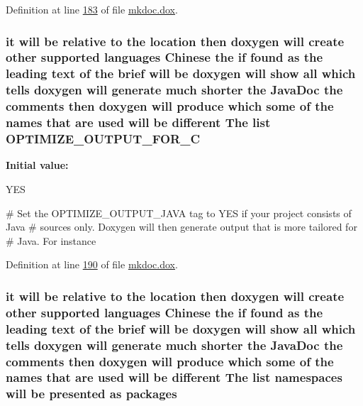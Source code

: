 Definition at line \hyperlink{mkdoc_8dox_source_l00183}{183} of file \hyperlink{mkdoc_8dox_source}{mkdoc.\-dox}.

\hypertarget{mkdoc_8dox_aa542a8f1572d888d9ecd0f903a299444}{
\subsubsection[{O\-P\-T\-I\-M\-I\-Z\-E\-\_\-\-O\-U\-T\-P\-U\-T\-\_\-\-F\-O\-R\-\_\-\-C}]{\setlength{\rightskip}{0pt plus 5cm}it will be relative to the location then doxygen will create other supported languages {\bf Chinese} the if found as the leading text of the brief will be doxygen will show all which tells doxygen will generate much shorter the Java\-Doc the comments then doxygen will produce which some of the names that {\bf are} used will be different The list O\-P\-T\-I\-M\-I\-Z\-E\-\_\-\-O\-U\-T\-P\-U\-T\-\_\-\-F\-O\-R\-\_\-\-C}}\label{mkdoc_8dox_aa542a8f1572d888d9ecd0f903a299444}
{\bfseries Initial value\-:}
\begin{DoxyCode}
 YES

\textcolor{preprocessor}{# Set the OPTIMIZE\_OUTPUT\_JAVA tag to YES if your project consists of Java }
\textcolor{preprocessor}{}\textcolor{preprocessor}{# sources only. Doxygen will then generate output that is more tailored for }
\textcolor{preprocessor}{# Java. For instance}
\end{DoxyCode}


Definition at line \hyperlink{mkdoc_8dox_source_l00190}{190} of file \hyperlink{mkdoc_8dox_source}{mkdoc.\-dox}.

\hypertarget{mkdoc_8dox_a299b82abc5d35aed83d60f05c2cb228c}{
\subsubsection[{packages}]{\setlength{\rightskip}{0pt plus 5cm}it will be relative to the location then doxygen will create other supported languages {\bf Chinese} the if found as the leading text of the brief will be doxygen will show all which tells doxygen will generate much shorter the Java\-Doc the comments then doxygen will produce which some of the names that {\bf are} used will be different The list namespaces will be presented as packages}}\label{mkdoc_8dox_a299b82abc5d35aed83d60f05c2cb228c}


